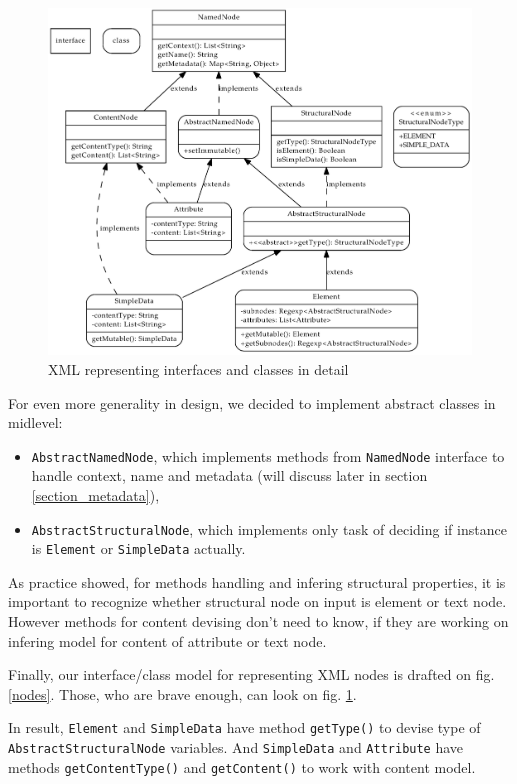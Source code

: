 \documentclass[a4paper,10pt,oneside]{article}
\newcommand{\code}[1]{\texttt{#1}}
\begin{document}
\begin{figure}
\centering\includegraphics[scale=0.3]{nodes_full}
\caption{XML representing interfaces and classes in detail} \label{nodes_full}
\end{figure}

For even more generality in design, we decided to implement abstract classes in midlevel:
\begin{itemize}
	\item \code{AbstractNamedNode}, which implements methods from \code{NamedNode} interface to handle context, name and metadata (will discuss later in section \ref{section_metadata}),
	\item \code{AbstractStructuralNode}, which implements only task of deciding if instance is \code{Element} or \code{SimpleData} actually.
\end{itemize}
As practice showed, for methods handling and infering structural properties, it is important to recognize whether structural node on input is element or text node.
However methods for content devising don't need to know, if they are working on infering model for content of attribute or text node.

Finally, our interface/class model for representing XML nodes is drafted on fig. \ref{nodes}. Those, who are brave enough, can look on fig. \ref{nodes_full}.

In result, \code{Element} and \code{SimpleData} have method \code{getType()} to devise type of \code{AbstractStructuralNode} variables. And \code{SimpleData} and \code{Attribute} have methods \code{getContentType()} and \code{getContent()} to work with content model.
\end{document}
